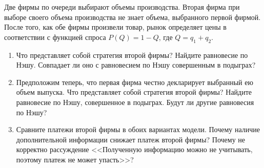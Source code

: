 \begin{problem}
Две фирмы по очереди выбирают объемы производства. Вторая фирма при выборе своего объема производства не знает объема, выбранного первой фирмой. После того, как обе фирмы произвели товар, рынок определяет цены в соответствии с функцией спроса  $P\left(Q\right)=1-Q$, где  $Q=q_{1} +q_{2} $.\par
\begin{enumerate}
\item  Что представляет собой стратегия второй фирмы? Найдите равновесие по Нэшу. Совпадает ли оно с равновесием по Нэшу совершенным в подыграх?\par
\item Предположим теперь, что первая фирма честно декларирует выбранный ею объем выпуска. Что представляет собой стратегия второй фирмы? Найдите равновесие по Нэшу, совершенное в подыграх. Будут ли другие равновесия по Нэшу?\par
\item  Сравните платежи второй фирмы в обоих вариантах модели. Почему наличие дополнительной информации снижает платеж второй фирмы? Почему не корректно рассуждение <<Полученную информацию можно не учитывать, поэтому платеж не может упасть>>?\par
\end{enumerate}


\begin{sol}

\end{sol}
\end{problem}



